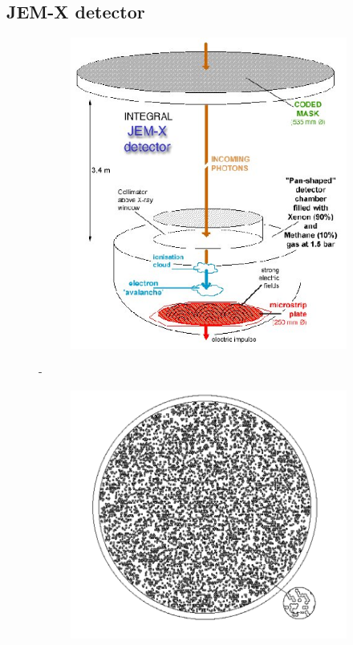         \subsection{JEM-X detector}
        
        \begin{figure}[H]
        \centering
        \begin{subfigure}{.45\textwidth}
            \includegraphics[width=\textwidth]{report/Figures/intro/jem_x_funct_diagram.jpg}
        \end{subfigure}%
        \hspace{1em}-
        \begin{subfigure}{.45\textwidth}
            \centering
            \includegraphics[width=\textwidth]{report/Figures/intro/jemx_coded_mask.png}

\end{subfigure}
\end{figure}
